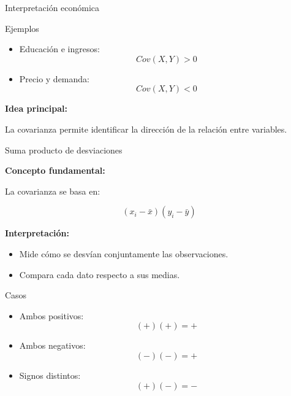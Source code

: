 \documentclass{beamer}
\begin{document}
\begin{frame}{Interpretación económica}

\begin{block}{Ejemplos}
\begin{itemize}
\item Educación e ingresos:
\[
Cov(X,Y)>0
\]

\item Precio y demanda:
\[
Cov(X,Y)<0
\]
\end{itemize}
\end{block}

\vspace{0.3cm}

\textbf{Idea principal:}

La covarianza permite identificar la dirección de la relación entre variables.

\end{frame}

\begin{frame}{Suma producto de desviaciones}

\textbf{Concepto fundamental:}

La covarianza se basa en:

\[
(x_i-\bar{x})(y_i-\bar{y})
\]

\vspace{0.1cm}

\textbf{Interpretación:}

\begin{itemize}
\item Mide cómo se desvían conjuntamente las observaciones.
\item Compara cada dato respecto a sus medias.
\end{itemize}

\vspace{0.0cm}

\begin{block}{Casos}
\begin{itemize}
\item Ambos positivos:
\[
(+)(+) = +
\]

\item Ambos negativos:
\[
(-)(-) = +
\]

\item Signos distintos:
\[
(+)(-) = -
\]
\end{itemize}
\end{block}

\end{frame}
\end{document}
